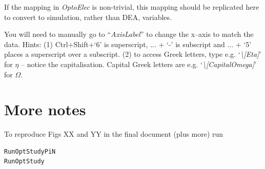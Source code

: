 \documentclass[]{article}  %
\begin{document}
If the mapping in \emph{OptoElec} is non-trivial, this mapping should be replicated here to convert to simulation, rather than DEA, variables.

You will need to manually go to ``\emph{AxisLabel}'' to change the x--axis to match the data. Hints: (1) Ctrl+Shift+`6' is superscript, ... + `-' is subscript and ... + `5' places a superscript over a subscript. (2) to access Greek letters, type e.g. `\emph{\textbackslash[Eta]}' for $\eta$ -- notice the capitalisation. Capital Greek letters are e.g. `\emph{\textbackslash[CapitalOmega]}' for $\Omega$.


\section{More notes}
To reproduce Figs XX and YY in the final document (plus more) run 
\begin{verbatim}
RunOptStudyPiN
RunOptStudy
\end{verbatim}
\end{document}
